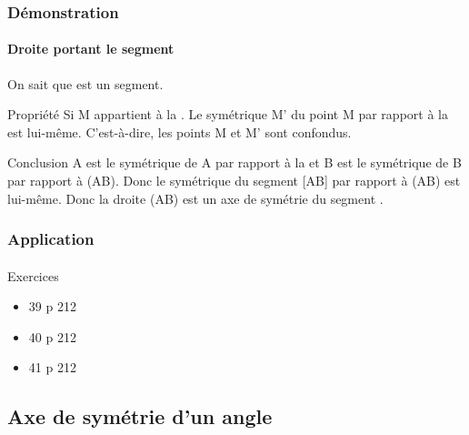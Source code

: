 \documentclass[xcolor={dvipsnames}]{beamer}
\begin{document}
\begin{frame}
	\frametitle{Démonstration}  
	\framesubtitle{Droite portant le segment}
	
	\begin{block}{On sait que}
		 est un segment.\pause
	\end{block}
	
	\begin{block}{Propriété}
		Si M appartient à la .
		Le symétrique M' du point M par rapport à la  est lui-même.
		C'est-à-dire, les points M et M' sont confondus.\pause
	\end{block}
	
	\begin{block}{Conclusion}
		A est le symétrique de A par rapport à la  et B est le symétrique de B par rapport à (AB).
		Donc le symétrique du segment [AB] par rapport à (AB) est lui-même.
		Donc la droite (AB) est un axe de symétrie du segment .
	\end{block}
\end{frame}

\begin{frame}
	\frametitle{Application}  
	\framesubtitle{}
	
	\begin{block}{Exercices}
		\begin{itemize}
			\item 39 p 212
			\item 40 p 212
			\item 41 p 212
		\end{itemize}
	\end{block}
\end{frame}

\subsection{Axe de symétrie d'un angle}
\end{document}
